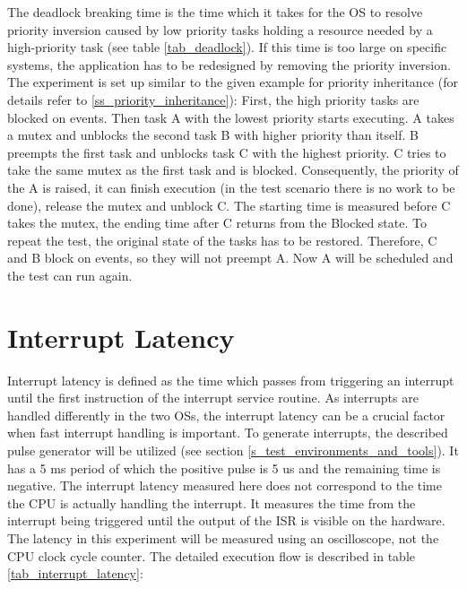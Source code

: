 The deadlock breaking time is the time which it takes for the \ac{OS} to resolve priority inversion caused by low priority tasks holding a resource needed by a high-priority task (see table \ref{tab_deadlock}). 
If this time is too large on specific systems, the application has to be redesigned by removing the priority inversion. 
The experiment is set up similar to the given example for priority inheritance (for details refer to \ref{ss_priority_inheritance}): 
First, the high priority tasks are blocked on events.
Then task A with the lowest priority starts executing.
A takes a mutex and unblocks the second task B with higher priority than itself.
B preempts the first task and unblocks task C with the highest priority. 
C tries to take the same mutex as the first task and is blocked.
Consequently, the priority of the A is raised, it can finish execution (in the test scenario there is no work to be done), release the mutex and unblock C.
The starting time is measured before C takes the mutex, the ending time after C returns from the Blocked state.
To repeat the test, the original state of the tasks has to be restored.
Therefore, C and B block on events, so they will not preempt A.
Now A will be scheduled and the test can run again.

\section{Interrupt Latency}
Interrupt latency is defined as the time which passes from triggering an interrupt until the first instruction of the interrupt service routine. 
As interrupts are handled differently in the two \acp{OS}, the interrupt latency can be a crucial factor when fast interrupt handling is important.
To generate interrupts, the described pulse generator will be utilized (see section \ref{s_test_environments_and_tools}).
It has a 5 ms period of which the positive pulse is 5 us and the remaining time is negative.
The interrupt latency measured here does not correspond to the time the \ac{CPU} is actually handling the interrupt.
It measures the time from the interrupt being triggered until the output of the \ac{ISR} is visible on the hardware.
The latency in this experiment will be measured using an oscilloscope, not the \ac{CPU} clock cycle counter.
The detailed execution flow is described in table \ref{tab_interrupt_latency}:

